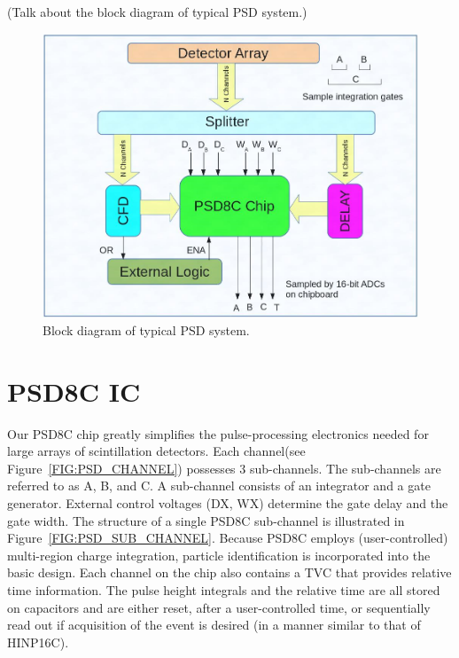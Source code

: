\documentclass[12pt,oneside,final]{siuethesis}
\theoremstyle{definition}
\begin{document}
(Talk about the block diagram of typical PSD system.)

\begin{figure}[htbp!]
	\centering
 	\includegraphics[scale=0.6,keepaspectratio=true]{./ch1_figures/PSD_block.png}
 	\caption{Block diagram of typical PSD system.}
 	\label{FIG:PSD_BLOCK}
\end{figure}


\section{PSD8C IC}

Our PSD8C chip greatly simplifies the pulse-processing electronics needed for large arrays of scintillation detectors. Each channel(see Figure~\ref{FIG:PSD_CHANNEL}) possesses 3 sub-channels. The sub-channels are referred to as A, B, and C. A sub-channel consists of an integrator and a gate generator. External control voltages (DX, WX) determine the gate delay and the gate width. The structure of a single PSD8C sub-channel is illustrated in Figure~\ref{FIG:PSD_SUB_CHANNEL}. Because PSD8C employs (user-controlled) multi-region charge integration, particle identification is incorporated into the basic design. Each channel on the chip also contains a TVC that provides relative time information. The pulse height integrals and the relative time are all stored on capacitors and are either reset, after a user-controlled time, or sequentially read out if acquisition of the event is desired (in a manner similar to that of HINP16C). 
\end{document}

